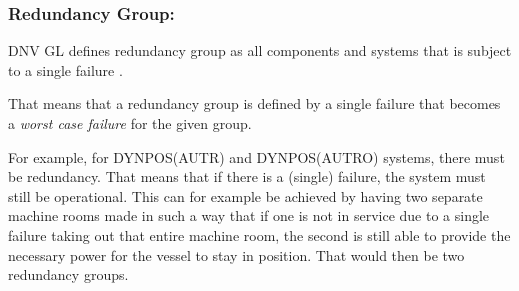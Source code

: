 \subsubsection{Redundancy Group:} 


DNV GL defines redundancy group as all components and systems that is subject to a single failure \cite{RulesShipsDNVGLPart6Chap3}.

That means that a redundancy group is defined by a single failure that becomes a \textit{worst case failure} for the given group.


For example, for DYNPOS(AUTR) and DYNPOS(AUTRO) systems, there must be redundancy. That means that if there is a (single) failure, the system must still be operational. This can for example be achieved by having two separate machine rooms made in such a way that if one is not in service due to a single failure taking out that entire machine room, the second is still able to provide the necessary power for the vessel to stay in position. That would then be two redundancy groups.   



    
    
